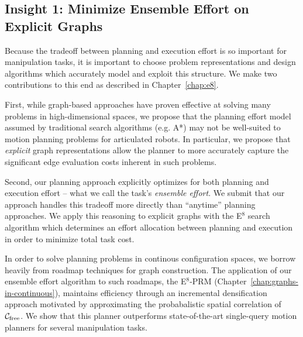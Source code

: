\subsection*{Insight 1: Minimize Ensemble Effort on Explicit Graphs}

Because the tradeoff between planning and execution effort
is so important for manipulation tasks,
it is important to choose problem representations and design algorithms
which accurately model and exploit this structure.
We make two contributions to this end
as described in Chapter~\ref{chap:e8}.

First,
while graph-based approaches have proven effective at solving
many problems in high-dimensional spaces,
we propose that the planning effort model assumed by
traditional search algorithms (e.g. A*)
may not be well-suited to motion planning problems for articulated
robots.
In particular,
we propose that \emph{explicit} graph representations
allow the planner to more accurately capture the significant
edge evaluation costs inherent in such problems.

Second,
our planning approach explicitly optimizes for both planning
and execution effort
-- what we call the task's \emph{ensemble effort}.
We submit that our approach handles this tradeoff more directly
than ``anytime'' planning approaches.
We apply this reasoning to explicit graphs
with the E$^8$ search algorithm
which determines an effort allocation between planning and execution
in order to minimize total task cost.

In order to solve planning problems in continous configuration spaces,
we borrow heavily from roadmap techniques for graph construction.
The application of our ensemble effort algorithm to such roadmaps,
the E$^8$-PRM (Chapter~\ref{chap:graphs-in-continuous}),
maintains efficiency through an
incremental densification approach
motivated by approximating the probabalistic spatial correlation of
$\mathcal{C}_{\mbox{\scriptsize free}}$.
We show that this planner outperforms state-of-the-art
single-query motion planners for several manipulation tasks.

